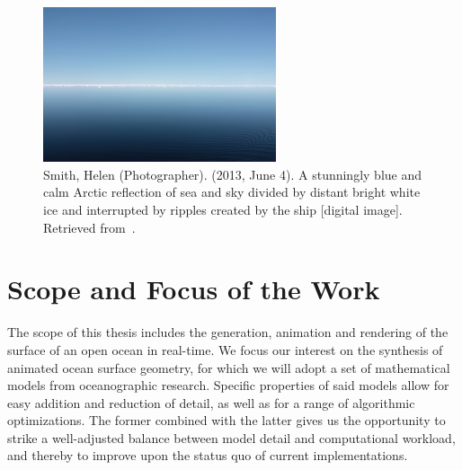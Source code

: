 %
%
%
\begin{figure}
\centering
\includegraphics[width=0.61\textwidth]{figures/helen-smith-arcticsea.jpg}
\caption{
	Smith, Helen (Photographer).
	(2013, June 4).
	A stunningly blue and calm Arctic reflection of sea and sky divided by distant
	bright white ice and interrupted by ripples created by the ship [digital image].
	Retrieved from~\citet{misc:noaa:arctic}.
	}
\label{fig:ocean:arctic}
\end{figure}
\section{Scope and Focus of the Work}
\label{sec:scope_and_focus}
The scope of this thesis includes the generation, animation and rendering of the
surface of an open ocean in real-time. We focus our interest on the synthesis of
animated ocean surface geometry, for which we will adopt a set of mathematical
models from oceanographic research. Specific properties of said models allow for
easy addition and reduction of detail, as well as for a range of algorithmic
optimizations. The former combined with the latter gives us the opportunity to
strike a well-adjusted balance between model detail and computational workload,
and thereby to improve upon the status quo of current implementations.
%
%
